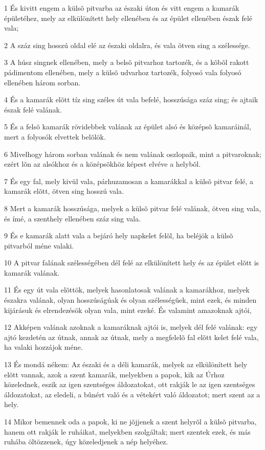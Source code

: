 \par 1 És kivitt engem a külsõ pitvarba az északi úton és vitt engem a kamarák épületéhez, mely az elkülönített hely ellenében és az épület ellenében észak felé vala;
\par 2 A száz sing hosszú oldal elé az északi oldalra, és vala ötven sing a szélessége.
\par 3 A húsz singnek ellenében, mely a belsõ pitvarhoz tartozék, és a kõbõl rakott pádimentom ellenében, mely a külsõ udvarhoz tartozék, folyosó vala folyosó ellenében három sorban.
\par 4 És a kamarák elõtt tíz sing széles út vala befelé, hosszúsága száz sing; és ajtaik észak felé valának.
\par 5 És a felsõ kamarák rövidebbek valának az épület alsó és középsõ kamaráinál, mert a folyosók elvettek belõlök.
\par 6 Mivelhogy három sorban valának és nem valának oszlopaik, mint a pitvaroknak; ezért lõn az alsókhoz és a középsõkhöz képest elvéve a helybõl.
\par 7 És egy fal, mely kivül vala, párhuzamosan a kamarákkal a külsõ pitvar felé, a kamarák elõtt, ötven sing hosszú vala.
\par 8 Mert a kamarák hosszúsága, melyek a külsõ pitvar felé valának, ötven sing vala, és ímé, a szenthely ellenében száz sing vala.
\par 9 És e kamarák alatt vala a bejáró hely napkelet felõl, ha beléjök a külsõ pitvarból méne valaki.
\par 10 A pitvar falának szélességében dél felé az elkülönített hely és az épület elõtt is kamarák valának.
\par 11 És egy út vala elõttök, melyek hasonlatosak valának a kamarákhoz, melyek északra valának, olyan hosszúságúak és olyan szélességûek, mint ezek, és minden kijárásuk és elrendezésök olyan vala, mint ezeké. És valamint amazoknak ajtói,
\par 12 Akképen valának azoknak a kamaráknak ajtói is, melyek dél felé valának: egy ajtó kezdetén az útnak, annak az útnak, mely a megfelelõ fal elõtt kelet felé vala, ha valaki hozzájok méne.
\par 13 És mondá nékem: Az északi és a déli kamarák, melyek az elkülönített hely elõtt vannak, azok a szent kamarák, melyekben a papok, kik az Úrhoz közelednek, eszik az igen szentséges áldozatokat, ott rakják le az igen szentséges áldozatokat, az eledeli, a bûnért való és a vétekért való áldozatot; mert szent az a hely.
\par 14 Mikor bemennek oda a papok, ki ne jõjjenek a szent helyrõl a külsõ pitvarba, hanem ott rakják le ruháikat, melyekben szolgáltak; mert szentek ezek, és más ruhába öltözzenek, úgy közeledjenek a nép helyéhez.
